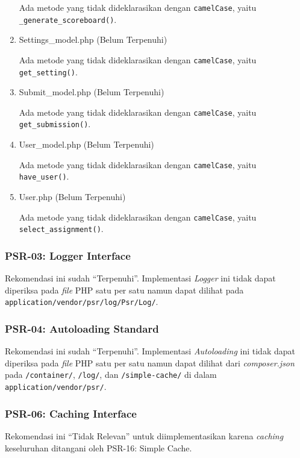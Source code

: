 \begin{enumerate}
	Ada metode yang tidak dideklarasikan dengan \texttt{camelCase}, yaitu \verb|_generate_scoreboard()|. %
	
	\item Settings\_model.php (Belum Terpenuhi)
	
	Ada metode yang tidak dideklarasikan dengan \texttt{camelCase}, yaitu \verb|get_setting()|. %
	
	\item Submit\_model.php (Belum Terpenuhi)
	
	Ada metode yang tidak dideklarasikan dengan \texttt{camelCase}, yaitu \verb|get_submission()|. %
	
	\item User\_model.php (Belum Terpenuhi)
	
	Ada metode yang tidak dideklarasikan dengan \texttt{camelCase}, yaitu \verb|have_user()|. %
	
	\item User.php (Belum Terpenuhi)
	
	Ada metode yang tidak dideklarasikan dengan \texttt{camelCase}, yaitu \verb|select_assignment()|. %
	
\end{enumerate}	


\subsubsection{PSR-03: Logger Interface}
Rekomendasi ini sudah ``Terpenuhi''. Implementasi \textit{Logger} ini tidak dapat diperiksa pada \textit{file} PHP satu per satu namun dapat dilihat pada \verb|application/vendor/psr/log/Psr/Log/|.



\subsubsection{PSR-04: Autoloading Standard}
Rekomendasi ini sudah ``Terpenuhi''. Implementasi \textit{Autoloading} ini tidak dapat diperiksa pada \textit{file} PHP satu per satu namun dapat dilihat dari \textit{composer.json} pada \verb|/container/|, \verb|/log/|, dan \verb|/simple-cache/| di dalam \verb|application/vendor/psr/|.


\subsubsection{PSR-06: Caching Interface}
Rekomendasi ini ``Tidak Relevan'' untuk diimplementasikan karena \textit{caching} keseluruhan ditangani oleh PSR-16: Simple Cache. 

